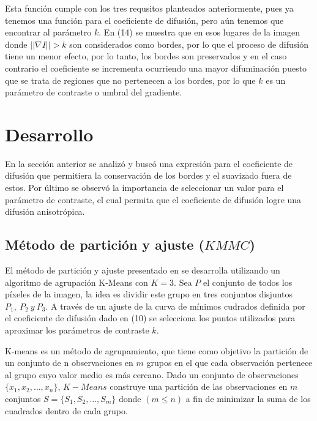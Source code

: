 \documentclass[a4paper,10pt,twocolumn]{article}
\begin{document}
Esta funci\'on cumple con los tres requsitos planteados anteriormente, pues ya tenemos una funci\'on para el coeficiente de difusi\'on, pero a\'un tenemos que encontrar al par\'ametro $k$. En (14) se muestra que en esos lugares de la imagen donde $|| \nabla I || > k$ son considerados como bordes, por lo que el proceso de difusi\'on tiene un menor efecto, por lo tanto, los bordes son preservados y en el caso contrario el coeficiente se incrementa ocurriendo una mayor difuminaci\'on puesto que se trata de regiones que no pertenecen a los bordes, por lo que $k$ es un par\'ametro de contraste o umbral del gradiente. 

\section{Desarrollo}\label{sec:desarrollo}

En la secci\'on anterior se analiz\'o y busc\'o una expresi\'on para el coeficiente de difusi\'on que permitiera la conservaci\'on de los bordes y el suavizado fuera de estos. Por \'ultimo se observ\'o la importancia de seleccionar un valor para el par\'ametro de contraste, el cual permita que el coeficiente de difusi\'on logre una difusi\'on anisotr\'opica. 

\subsection{M\'etodo de partici\'on y ajuste ($KMMC$)}\label{sec:kmmc}

El m\'etodo de partici\'on y ajuste presentado en \cite{borroto}	se desarrolla utilizando un algoritmo de agrupaci\'on K-Means con $K=3$. Sea $P$ el conjunto de todos los p\'ixeles de la imagen, la idea es dividir este grupo en tres conjuntos disjuntos $P_1,\ P_2\ y\ P_3$. A trav\'es de un ajuste de la curva de m\'inimos cudrados definida por el coeficiente de difusi\'on dado en (10) se selecciona los puntos utilizados para aproximar los par\'ametros de contraste $k$.

K-means es un m\'etodo de agrupamiento, que tiene como objetivo la partici\'on de un conjunto de n observaciones en $m$ grupos en el que cada observaci\'on pertenece al grupo cuyo valor medio es m\'as cercano. Dado un conjunto de observaciones $\{x_1, x_2, …, x_n\}$, $K-Means$ construye una partici\'on de las observaciones en $m$ conjuntos $S = \{S_1, S_2, …, S_m\}$ donde $(m \leq n)$ a fin de minimizar la suma de los cuadrados dentro de cada grupo.
\end{document}
